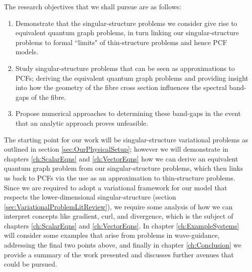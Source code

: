 The research objectives that we shall pursue are as follows:
\begin{enumerate}
	\item Demonstrate that the singular-structure problems we consider give rise to equivalent quantum graph problems, in turn linking our singular-structure problems to formal ``limits" of thin-structure problems and hence PCF models.
	\item Study singular-structure problems that can be seen as approximations to PCFs; deriving the equivalent quantum graph problems and providing insight into how the geometry of the fibre cross section influences the spectral band-gaps of the fibre.
	\item Propose numerical approaches to determining these band-gaps in the event that an analytic approach proves unfeasible.
\end{enumerate}
The starting point for our work will be singular-structure variational problems as outlined in section \ref{sec:OurPhysicalSetup}; however we will demonstrate in chapters \ref{ch:ScalarEqns} and \ref{ch:VectorEqns} how we can derive an equivalent quantum graph problem from our singular-structure problems, which then links us back to PCFs via the use as an approximation to thin-structure problems.
Since we are required to adopt a variational framework for our model that respects the lower-dimensional singular-structure (section \ref{sec:VariationalProblemLitReview}), we require some analysis of how we can interpret concepts like gradient, curl, and divergence, which is the subject of chapters \ref{ch:ScalarEqns} and \ref{ch:VectorEqns}.
In chapter \ref{ch:ExampleSystems} will consider some examples that arise from problems in wave-guidance, addressing the final two points above, and finally in chapter \ref{ch:Conclusion} we provide a summary of the work presented and discusses further avenues that could be pursued.